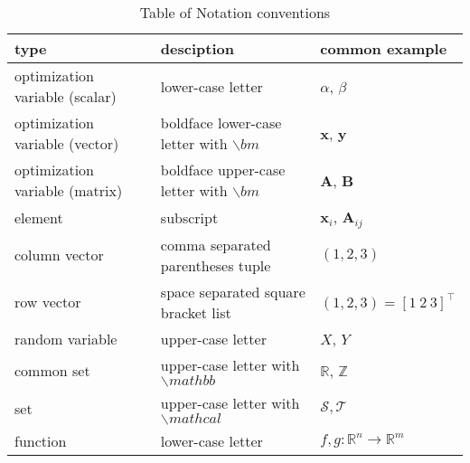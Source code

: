 \documentclass[preview]{standalone}
\begin{document}
    
\begin{table} \footnotesize  
    \caption{Table of Notation conventions}
    \begin{tabularx}{\linewidth}{lll}
    \hline
    type & desciption & common example \\ \hline \hline
    optimization variable (scalar) & lower-case letter & $\alpha$, $\beta$ \\
    optimization variable (vector) & boldface lower-case letter with $\backslash bm$ & $\bm{x}$, $\bm{y}$ \\
    optimization variable (matrix) & boldface upper-case letter with $\backslash bm$ & $\bm{A}$, $\bm{B}$ \\
    element & subscript & $\bm{x}_i$, $\bm{A}_{ij}$ \\
    column vector & comma separated parentheses tuple &  $(1,2,3)$\\
    row vector & space separated square bracket list &  $(1,2,3) = [1\ 2\ 3]^{\top}$\\
    random variable & upper-case letter & $X$, $Y$ \\
    common set & upper-case letter with $\backslash mathbb$ & $\mathbb{R}$, $\mathbb{Z}$ \\
    set & upper-case letter with $\backslash mathcal$ & $\mathcal{S}, \mathcal{T} $ \\
    function & lower-case letter & $f,g:\mathbb{R}^n \rightarrow \mathbb{R}^m$ \\
    
    \hline 
    \end{tabularx}
\end{table}
\end{document}
